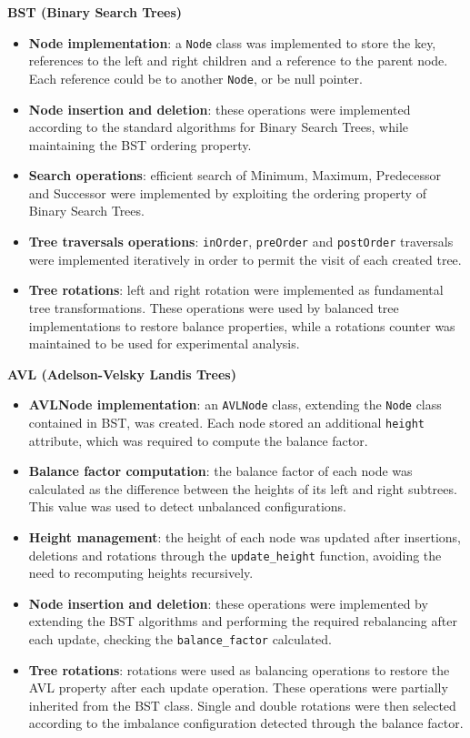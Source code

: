 \documentclass[12pt,a4paper]{article}
\begin{document}
        \textbf{BST (Binary Search Trees)}
            \begin{itemize}
                \item \textbf{Node implementation}: a \texttt{Node} class was implemented to store the key, references to the left and right children and a reference to the parent node. Each reference could be to another \texttt{Node}, or be null pointer.
                \item \textbf{Node insertion and deletion}: these operations were implemented according to the standard algorithms for Binary Search Trees, while maintaining the BST ordering property.
                \item \textbf{Search operations}: efficient search of Minimum, Maximum, Predecessor and Successor were implemented by exploiting the ordering property of Binary Search Trees.
                \item \textbf{Tree traversals operations}: \texttt{inOrder}, \texttt{preOrder} and \texttt{postOrder} traversals were implemented iteratively in order to permit the visit of each created tree.
                \item \textbf{Tree rotations}: left and right rotation were implemented as fundamental tree transformations. These operations were used by balanced tree implementations to restore balance properties, while a rotations counter was maintained to be used for experimental analysis.
            \end{itemize}

        \textbf{AVL (Adelson-Velsky Landis Trees)}
            \begin{itemize}
                \item \textbf{AVLNode implementation}: an \texttt{AVLNode} class, extending the \texttt{Node} class contained in BST, was created. Each node stored an additional \texttt{height} attribute, which was required to compute the balance factor.
                \item \textbf{Balance factor computation}: the balance factor of each node was calculated as the difference between the heights of its left and right subtrees. This value was used to detect unbalanced configurations.
                \item \textbf{Height management}: the height of each node was updated after insertions, deletions and rotations through the \texttt{update\_height} function, avoiding the need to recomputing heights recursively.
                \item \textbf{Node insertion and deletion}: these operations were implemented by extending the BST algorithms and performing the required rebalancing after each update, checking the \texttt{balance\_factor} calculated.
                \item \textbf{Tree rotations}: rotations were used as balancing operations to restore the AVL property after each update operation. These operations were partially inherited from the BST class. Single and double rotations were then selected according to the imbalance configuration detected through the balance factor.
            \end{itemize}
\end{document}
